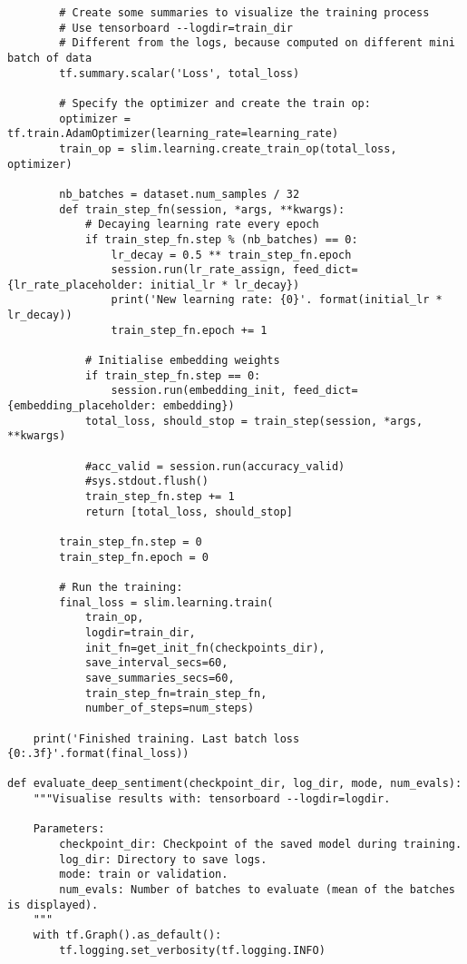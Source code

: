 \begin{lstlisting}
        # Create some summaries to visualize the training process
        # Use tensorboard --logdir=train_dir
        # Different from the logs, because computed on different mini batch of data
        tf.summary.scalar('Loss', total_loss)
      
        # Specify the optimizer and create the train op:
        optimizer = tf.train.AdamOptimizer(learning_rate=learning_rate)
        train_op = slim.learning.create_train_op(total_loss, optimizer)

        nb_batches = dataset.num_samples / 32
        def train_step_fn(session, *args, **kwargs):
            # Decaying learning rate every epoch
            if train_step_fn.step % (nb_batches) == 0:
                lr_decay = 0.5 ** train_step_fn.epoch
                session.run(lr_rate_assign, feed_dict={lr_rate_placeholder: initial_lr * lr_decay})
                print('New learning rate: {0}'. format(initial_lr * lr_decay))
                train_step_fn.epoch += 1

            # Initialise embedding weights
            if train_step_fn.step == 0:
                session.run(embedding_init, feed_dict={embedding_placeholder: embedding})
            total_loss, should_stop = train_step(session, *args, **kwargs)

            #acc_valid = session.run(accuracy_valid)
            #sys.stdout.flush()
            train_step_fn.step += 1
            return [total_loss, should_stop]
        
        train_step_fn.step = 0
        train_step_fn.epoch = 0

        # Run the training:
        final_loss = slim.learning.train(
            train_op,
            logdir=train_dir,
            init_fn=get_init_fn(checkpoints_dir),
            save_interval_secs=60,
            save_summaries_secs=60,
            train_step_fn=train_step_fn,
            number_of_steps=num_steps)
            
    print('Finished training. Last batch loss {0:.3f}'.format(final_loss))

def evaluate_deep_sentiment(checkpoint_dir, log_dir, mode, num_evals):
    """Visualise results with: tensorboard --logdir=logdir.
    
    Parameters:
        checkpoint_dir: Checkpoint of the saved model during training.
        log_dir: Directory to save logs.
        mode: train or validation.
        num_evals: Number of batches to evaluate (mean of the batches is displayed).
    """
    with tf.Graph().as_default():
        tf.logging.set_verbosity(tf.logging.INFO)


\end{lstlisting}
